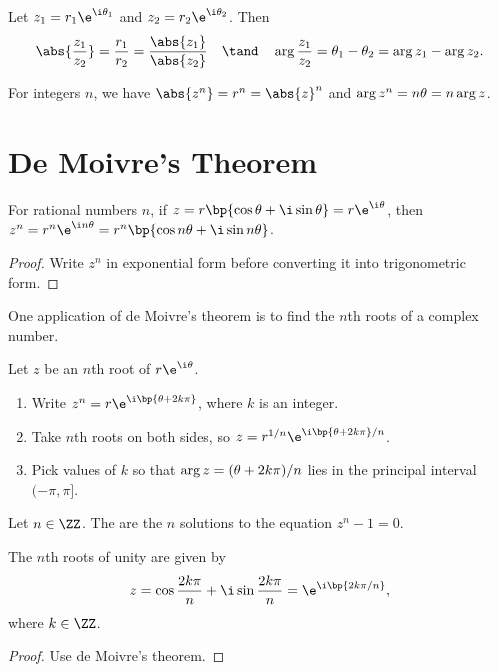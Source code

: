 \begin{corollary}
    Let $z_1 = r_1 \e^{\i \t_1}$ and $z_2 = r_2 \e^{\i \t_2}$. Then \[\abs{\frac{z_1}{z_2}} = \frac{r_1}{r_2} = \frac{\abs{z_1}}{\abs{z_2}} \quad \tand \quad \arg{\frac{z_1}{z_2}} = \t_1 - \t_2 = \arg{z_1} - \arg{z_2}.\]
\end{corollary}

\begin{corollary}
    For integers $n$, we have $\abs{z^n} = r^n = \abs{z}^n$ and $\arg{z^n} = n \theta = n \arg{z}$.
\end{corollary}

\section{De Moivre's Theorem}

\begin{theorem}
    For rational numbers $n$, if $z = r\bp{\cos \t + \i \sin \t} = r \e^{\i \t}$, then $z^n = r^n \e^{\i n \t} = r^n \bp{\cos n\t + \i \sin n\t}$.
\end{theorem}
\begin{proof}
    Write $z^n$ in exponential form before converting it into trigonometric form.
\end{proof}

One application of de Moivre's theorem is to find the $n$th roots of a complex number.

\begin{recipe}
    Let $z$ be an $n$th root of $r\e^{\i\t}$.
    \phantom{.}
    \begin{enumerate}
        \item Write $z^n = r \e^{\i \bp{\t + 2k\pi}}$, where $k$ is an integer.
        \item Take $n$th roots on both sides, so $z = r^{1/n} \e^{\i \bp{\t + 2k\pi} /n}$.
        \item Pick values of $k$ so that $\arg z = (\theta + 2k\pi)/n$ lies in the principal interval $(-\pi, \pi]$.
    \end{enumerate}
\end{recipe}

\begin{definition}
    Let $n \in \ZZ$. The  are the $n$ solutions to the equation $z^n - 1 = 0$.
\end{definition}

\begin{proposition}
    The $n$th roots of unity are given by \[z = \cos{\frac{2k \pi}{n}} + \i \sin{\frac{2k \pi}{n}} = \e^{\i \bp{2k \pi / n}},\] where $k \in \ZZ$.
\end{proposition}
\begin{proof}
    Use de Moivre's theorem.
\end{proof}

